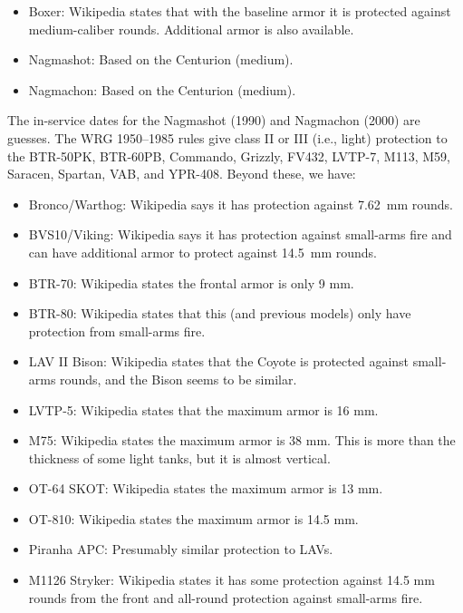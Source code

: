 \begin{withcounters}
{        
        \begin{itemize}
            \item Boxer: Wikipedia states that with the baseline armor it is protected against medium-caliber rounds. Additional armor is also available.
            \item Nagmashot: Based on the Centurion (medium).
            \item Nagmachon: Based on the Centurion (medium).
        \end{itemize}
        The in-service dates for the Nagmashot (1990) and Nagmachon (2000) are guesses.
        The WRG 1950--1985 rules give class II or III (i.e., light) protection to the
        BTR-50PK,
        BTR-60PB,
        Commando,
        Grizzly,
        FV432,
        LVTP-7,
        M113,
        M59,
        Saracen,
        Spartan,
        VAB, and
        YPR-408.
        Beyond these, we have:
        \begin{itemize}
            \item Bronco/Warthog: Wikipedia says it has protection against 7.62~mm rounds.
            \item BVS10/Viking: Wikipedia says it has protection against small-arms fire and can have additional armor to protect against 14.5~mm rounds.
            \item BTR-70: Wikipedia states the frontal armor is only 9 mm.
            \item BTR-80: Wikipedia states that this (and previous models) only have protection from small-arms fire.
            \item LAV II Bison: Wikipedia states that the Coyote is protected against small-arms rounds, and the Bison seems to be similar.
            \item LVTP-5: Wikipedia states that the maximum armor is 16 mm.
            \item M75: Wikipedia states the maximum armor is 38 mm. This is more than the thickness of some light tanks, but it is almost vertical.
            \item OT-64 SKOT: Wikipedia states the maximum armor is 13 mm.
            \item OT-810: Wikipedia states the maximum armor is 14.5 mm.
            \item Piranha APC: Presumably similar protection to LAVs.
            \item M1126 Stryker: Wikipedia states it has some protection against 14.5 mm rounds from the front and all-round protection against small-arms fire.

\end{itemize}}
\end{withcounters}
